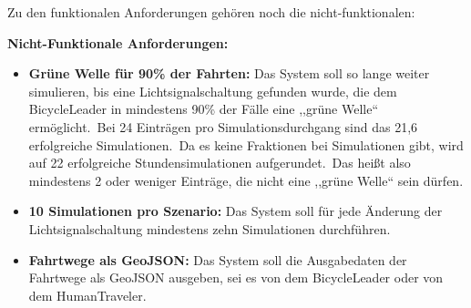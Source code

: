 Zu den funktionalen Anforderungen gehören noch die nicht-funktionalen:

\textbf{Nicht-Funktionale Anforderungen:}

\begin{itemize}
    \item \textbf{Grüne Welle für 90\% der Fahrten:} Das System soll so lange weiter simulieren, bis eine Lichtsignalschaltung gefunden wurde, die dem BicycleLeader in mindestens 90\% der Fälle eine ,,grüne Welle`` ermöglicht.~Bei 24 Einträgen pro Simulationsdurchgang sind das 21,6 erfolgreiche Simulationen.~Da es keine Fraktionen bei Simulationen gibt, wird auf 22 erfolgreiche Stundensimulationen aufgerundet.~Das heißt also mindestens 2 oder weniger Einträge, die nicht eine ,,grüne Welle`` sein dürfen.
    \item \textbf{10 Simulationen pro Szenario:} Das System soll für jede Änderung der Lichtsignalschaltung mindestens zehn Simulationen durchführen.
    \item \textbf{Fahrtwege als GeoJSON:} Das System soll die Ausgabedaten der Fahrtwege als GeoJSON ausgeben, sei es von dem BicycleLeader oder von dem HumanTraveler.
\end{itemize}
